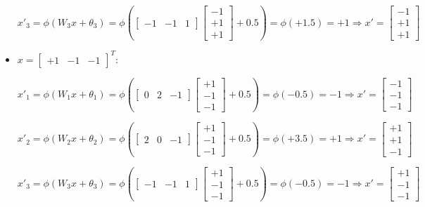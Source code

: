 \documentclass[letterpaper,headings=standardclasses]{scrartcl}
\begin{document}
\begin{itemize}
$$ x'_{3} = \phi(W_3 x + \theta_3) = \phi \left( \left[ \begin{matrix} -1 & -1 & 1 \end{matrix} \right] \left[ \begin{matrix} -1 \\ +1 \\ +1 \end{matrix} \right] + 0.5 \right) = \phi \left( +1.5 \right) = +1 \Rightarrow x' = \left[ \begin{matrix} -1 \\ +1 \\ +1 \end{matrix} \right] $$

\item $x = [\begin{matrix} +1 & -1 & -1 \end{matrix}]^T$:

$$ x'_{1} = \phi(W_1 x + \theta_1) = \phi \left( \left[ \begin{matrix} 0 & 2 & -1 \end{matrix} \right] \left[ \begin{matrix} +1 \\ -1 \\ -1 \end{matrix} \right] + 0.5 \right) = \phi \left( -0.5 \right) = -1 \Rightarrow x' = \left[ \begin{matrix} -1 \\ -1 \\ -1 \end{matrix} \right] $$

$$ x'_{2} = \phi(W_2 x + \theta_2) = \phi \left( \left[ \begin{matrix} 2 & 0 & -1 \end{matrix} \right] \left[ \begin{matrix} +1 \\ -1 \\ -1 \end{matrix} \right] + 0.5 \right) = \phi \left( +3.5 \right) = +1 \Rightarrow x' = \left[ \begin{matrix} +1 \\ +1 \\ -1 \end{matrix} \right] $$

$$ x'_{3} = \phi(W_3 x + \theta_3) = \phi \left( \left[ \begin{matrix} -1 & -1 & 1 \end{matrix} \right] \left[ \begin{matrix} +1 \\ -1 \\ -1 \end{matrix} \right] + 0.5 \right) = \phi \left( -0.5 \right) = -1 \Rightarrow x' = \left[ \begin{matrix} +1 \\ -1 \\ -1 \end{matrix} \right] $$


\end{itemize}
\end{document}
